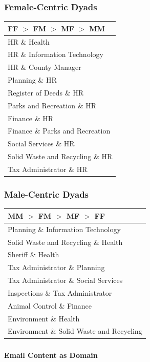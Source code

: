 \documentclass[xcolor={table}]{beamer}
\begin{document}
\begin{frame}\frametitle{Female-Centric Dyads}
	\centering
	\Large
	\begin{tabular}{l}
	  \toprule
	FF $>$ FM $>$ MF $>$ MM  \\
	\hline
	  HR \& Health  \\ 
	  HR \& Information Technology  \\ 
	  HR \& County Manager  \\ 
	  Planning \& HR \\ 
	  Register of Deeds \& HR  \\ 
	  Parks and Recreation \& HR  \\ 
	  Finance \& HR  \\ 
	  Finance \& Parks and Recreation  \\ 
	  Social Services \& HR  \\ 
	  Solid Waste and Recycling \& HR  \\ 
	  Tax Administrator \& HR  \\ 
	   \bottomrule
	\end{tabular}
	
	
	
	
\end{frame}


\begin{frame}\frametitle{Male-Centric Dyads}
	\centering
	\Large
	\begin{tabular}{l}
	  \toprule
	  MM $>$ FM $>$ MF $>$ FF \\ 
	  \midrule
	  Planning \& Information Technology \\ 
	  Solid Waste and Recycling \& Health \\ 
	  Sheriff \& Health  \\ 
	  Tax Administrator \& Planning  \\ 
	  Tax Administrator \& Social Services  \\ 
	  Inspections \& Tax Administrator  \\ 
	  Animal Control \& Finance   \\ 
	  Environment \& Health  \\ 
	  Environment \& Solid Waste and Recycling  \\  
	   \bottomrule
	\end{tabular}
	
	
	
	
\end{frame}

\begin{frame}\frametitle{}
	\begin{center}
		\Huge\textbf{Email Content as Domain}
	\end{center}
\end{frame}
\end{document}
